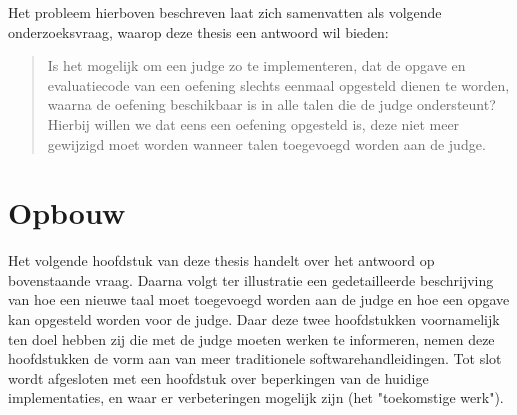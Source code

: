 Het probleem hierboven beschreven laat zich samenvatten als volgende onderzoeksvraag, waarop deze thesis een antwoord wil bieden:

\begin{quote}
    Is het mogelijk om een judge zo te implementeren, dat de opgave en evaluatiecode van een oefening slechts eenmaal opgesteld dienen te worden, waarna de oefening beschikbaar is in alle talen die de judge ondersteunt?
    Hierbij willen we dat eens een oefening opgesteld is, deze niet meer gewijzigd moet worden wanneer talen toegevoegd worden aan de judge.
\end{quote}

\section{Opbouw}\label{sec:opbouw}

Het volgende hoofdstuk van deze thesis handelt over het antwoord op bovenstaande vraag.
Daarna volgt ter illustratie een gedetailleerde beschrijving van hoe een nieuwe taal moet toegevoegd worden aan de judge en hoe een opgave kan opgesteld worden voor de judge.
Daar deze twee hoofdstukken voornamelijk ten doel hebben zij die met de judge moeten werken te informeren, nemen deze hoofdstukken de vorm aan van meer traditionele softwarehandleidingen.
Tot slot wordt afgesloten met een hoofdstuk over beperkingen van de huidige implementaties, en waar er verbeteringen mogelijk zijn (het "toekomstige werk").
